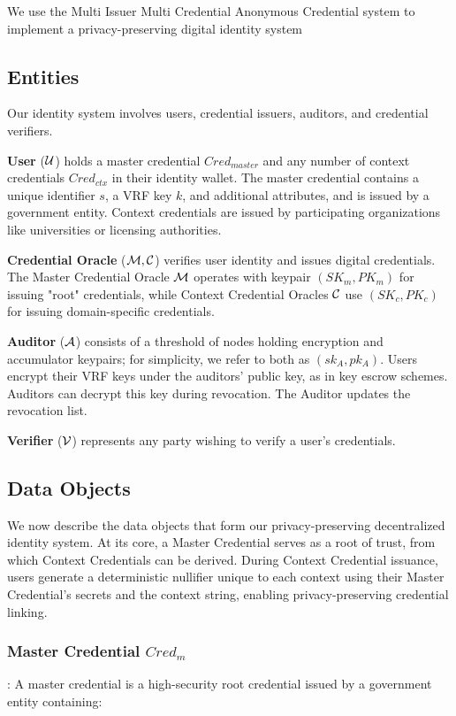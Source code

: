 We use the Multi Issuer Multi Credential Anonymous Credential system to implement a privacy-preserving digital identity system

\subsection{Entities}
Our identity system involves users, credential issuers, auditors, and credential verifiers.

\noindent \textbf{User} ($\mathcal{U}$) holds a master credential $Cred_{master}$ and any number of context credentials $Cred_{ctx}$ in their identity wallet. The master credential contains a unique identifier $s$, a VRF key $k$, and additional attributes, and is issued by a government entity. Context credentials are issued by participating organizations like universities or licensing authorities.

\noindent \textbf{Credential Oracle} ($\mathcal{M}, \mathcal{C}$) verifies user identity and issues digital credentials. The Master Credential Oracle $\mathcal{M}$ operates with keypair $(SK_{m}, PK_{m})$ for issuing "root" credentials, while Context Credential Oracles $\mathcal{C}$ use $(SK_{c}, PK_{c})$ for issuing domain-specific credentials.

\noindent \textbf{Auditor} ($\mathcal{A}$) consists of a threshold of nodes holding encryption and accumulator keypairs; for simplicity, we refer to both as $(sk_A, pk_A)$. Users encrypt their VRF keys under the auditors' public key, as in key escrow schemes. Auditors can decrypt this key during revocation. The Auditor updates the revocation list. 

\noindent \textbf{Verifier} ($\mathcal{V}$) represents any party wishing to verify a user's credentials.

\subsection{Data Objects}

We now describe the data objects that form our privacy-preserving decentralized identity system. At its core, a Master Credential serves as a root of trust, from which Context Credentials can be derived. During Context Credential issuance, users generate a deterministic nullifier unique to each context using their Master Credential's secrets and the context string, enabling privacy-preserving credential linking.

\subsubsection{Master Credential $Cred_m$}: 
A master credential is a high-security root credential issued by a government entity containing:

